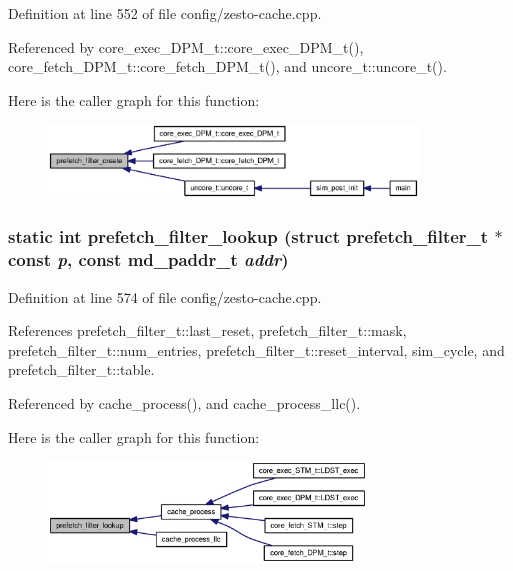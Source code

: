 Definition at line 552 of file config/zesto-cache.cpp.

Referenced by core\_\-exec\_\-DPM\_\-t::core\_\-exec\_\-DPM\_\-t(), core\_\-fetch\_\-DPM\_\-t::core\_\-fetch\_\-DPM\_\-t(), and uncore\_\-t::uncore\_\-t().

Here is the caller graph for this function:\nopagebreak
\begin{figure}[H]
\begin{center}
\leavevmode
\includegraphics[width=278pt]{config_2zesto-cache_8cpp_81be4d7fbc22a3d9f3fcaa52715c22e9_icgraph}
\end{center}
\end{figure}
\subsubsection[{prefetch\_\-filter\_\-lookup}]{\setlength{\rightskip}{0pt plus 5cm}static int prefetch\_\-filter\_\-lookup (struct {\bf prefetch\_\-filter\_\-t} $\ast$const  {\em p}, \/  const {\bf md\_\-paddr\_\-t} {\em addr})\hspace{0.3cm}{\tt  [static]}}\label{config_2zesto-cache_8cpp_17dbb4e8d2ae84f22541bef1c04253de}




Definition at line 574 of file config/zesto-cache.cpp.

References prefetch\_\-filter\_\-t::last\_\-reset, prefetch\_\-filter\_\-t::mask, prefetch\_\-filter\_\-t::num\_\-entries, prefetch\_\-filter\_\-t::reset\_\-interval, sim\_\-cycle, and prefetch\_\-filter\_\-t::table.

Referenced by cache\_\-process(), and cache\_\-process\_\-llc().

Here is the caller graph for this function:\nopagebreak
\begin{figure}[H]
\begin{center}
\leavevmode
\includegraphics[width=239pt]{config_2zesto-cache_8cpp_17dbb4e8d2ae84f22541bef1c04253de_icgraph}
\end{center}
\end{figure}
